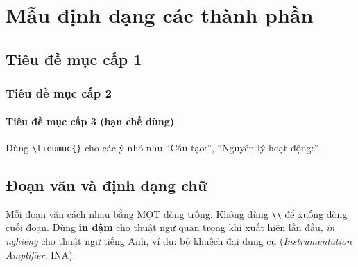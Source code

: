 

\chapter{Mẫu định dạng các thành phần}
\label{chap:cX}

\section{Tiêu đề mục cấp 1}
\label{sec:cX:muc-cap-1}

\subsection{Tiêu đề mục cấp 2}
\label{sec:cX:muc-cap-2}

\subsubsection{Tiêu đề mục cấp 3 (hạn chế dùng)}

Dùng \verb|\tieumuc{}| cho các ý nhỏ như “Cấu tạo:”, “Nguyên lý hoạt động:”.

\section{Đoạn văn và định dạng chữ}
\label{sec:cX:doan-van}

Mỗi đoạn văn cách nhau bằng MỘT dòng trống. Không dùng \verb|\\| để xuống dòng
cuối đoạn. Dùng \textbf{in đậm} cho thuật ngữ quan trọng khi xuất hiện lần đầu,
\textit{in nghiêng} cho thuật ngữ tiếng Anh, ví dụ: bộ khuếch đại dụng cụ
(\textit{Instrumentation Amplifier}, INA).

